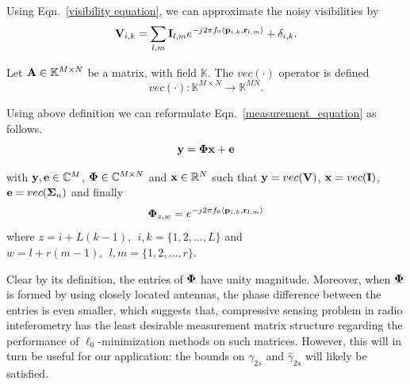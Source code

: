 \documentclass[aoas,preprint]{imsart}
\numberwithin{equation}{section}
\theoremstyle{plain}
\begin{document}
{Using Eqn.~\ref{visibility equation}, we can approximate the noisy visibilities by
\begin{equation}\label{measurement_equation}
    {\bf V}_{i, k} = \sum_{l, m} {\bf I}_{l, m} e^{-j2\pi f_0 \langle{\bf p}_{i, k}, {\bf r}_{l, m}\rangle} + \delta_{i, k}.
\end{equation}

\begin{definition}
Let ${\bf A} \in \mathbb{K}^{M\times N}$ be a matrix, with field ${\mathbb{K}}$. The $vec(\cdot)$ operator is defined
\begin{equation*}
    {vec(\cdot)}: \mathbb{K}^{M\times N} \rightarrow \mathbb{K}^{MN}.
\end{equation*}
\end{definition}
\vspace{0.5em}

Using above definition we can reformulate Eqn.~\ref{measurement_equation} as follows.
\begin{equation}
    {\bf y} = {\bf \Phi}{\bf x} + {\bf e}
\end{equation}

with ${\bf y}, {\bf e} \in \mathbb{C}^{M}$, ${\bf \Phi} \in \mathbb{C}^{M\times N}$ and ${\bf x} \in \mathbb{R}^{N}$ such that ${\bf y} = vec({\bf V})$, ${\bf x} = vec({\bf I})$, ${\bf e} = vec(\boldsymbol{\Sigma}_n)$ and finally
\begin{equation}
    {\bf \Phi}_{z,w} = e^{-j2\pi f_0 \langle {\bf p}_{i, k}, {\bf r}_{l, m} \rangle } 
\end{equation}
where $z = i + L(k-1), \ \ i, k = \{1, 2, ..., L\}$ and $w = l + r(m-1), \ \ l, m = \{1, 2, ..., r\}$.
\vspace{0.5em}

Clear by its definition, the entries of ${\bf \Phi}$ have unity magnitude. Moreover, when ${\bf \Phi}$ is formed by using closely located antennas, the phase difference between the entries is even smaller, which suggests that, compressive sensing problem in radio inteferometry has the least desirable measurement matrix structure regarding the performance of $\ell_0$-minimization methods on such matrices. However, this will in turn be useful for our application: the bounds on $\gamma_{2s}$ and $\hat{\gamma}_{2s}$ will likely be satisfied.

}
\end{document}
